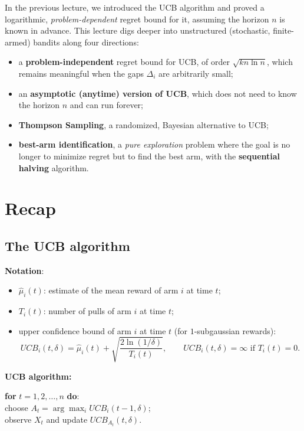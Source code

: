 

In the previous lecture, we introduced the UCB algorithm and proved a logarithmic, \emph{problem-dependent} regret bound for it, assuming the horizon $n$ is known in advance. This lecture digs deeper into unstructured (stochastic, finite-armed) bandits along four directions:
\begin{itemize}
    \item a \textbf{problem-independent} regret bound for UCB, of order $\sqrt{kn\ln n}$, which remains meaningful when the gaps $\Delta_i$ are arbitrarily small;
    \item an \textbf{asymptotic (anytime) version of UCB}, which does not need to know the horizon $n$ and can run forever;
    \item \textbf{Thompson Sampling}, a randomized, Bayesian alternative to UCB;
    \item \textbf{best-arm identification}, a \emph{pure exploration} problem where the goal is no longer to minimize regret but to find the best arm, with the \textbf{sequential halving} algorithm.
\end{itemize}

\section{Recap}

\subsection{The UCB algorithm}

\textbf{Notation}:
\begin{itemize}
    \item $\hat{\mu}_i(t)$: estimate of the mean reward of arm $i$ at time $t$;
    \item $T_i(t)$: number of pulls of arm $i$ at time $t$;
    \item upper confidence bound of arm $i$ at time $t$ (for $1$-subgaussian rewards):
    \[
    UCB_i(t, \delta) = \hat{\mu}_i(t) + \sqrt{\frac{2\ln(1/\delta)}{T_i(t)}}, \qquad UCB_i(t,\delta) = \infty \text{ if } T_i(t) = 0.
    \]
\end{itemize}

\textbf{UCB algorithm:}

\textbf{for} $t = 1, 2, \dots, n$ \textbf{do}: \\
 choose $A_t = \arg\max_i UCB_i(t-1, \delta)$; \\
 observe $X_t$ and update $UCB_{A_t}(t, \delta)$.

